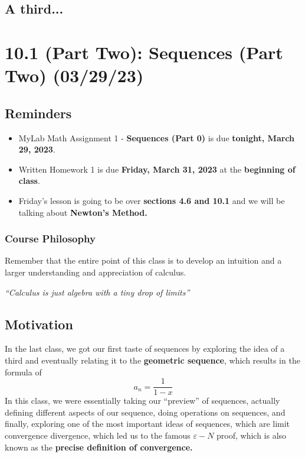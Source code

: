 \documentclass{report}
\begin{document}
\begin{sloppypar}
\section{A third...}

\chapter{10.1 (Part Two): Sequences (Part Two) (03/29/23)}
\section{Reminders}
\begin{itemize}
  \item MyLab Math Assignment 1 - \textbf{Sequences (Part 0)} is
        due \textbf{tonight, March 29, 2023}.
  \item Written Homework 1 is due \textbf{Friday, March 31,
        2023} at the \textbf{beginning of class}.
  \item Friday's lesson is going to be over \textbf{sections
        4.6 and 10.1} and we will be talking about \textbf{
        Newton's Method. }
\end{itemize}
\subsection{Course Philosophy}
Remember that the entire point of this class is to develop
an intuition and a larger understanding and appreciation of
calculus.
\begin{center}
  \textit{``Calculus is just algebra with a tiny drop of
    limits''}
\end{center}
\section{Motivation}
In the last class, we got our first taste of sequences
by exploring the idea of a third and eventually relating it
to the \textbf{geometric sequence}, which results in the formula
of
\[ a_{n} = \frac{1}{1-x}\]
In this class, we were essentially taking our ``preview'' of
sequences, actually defining different aspects of our sequence,
doing operations on sequences, and finally, exploring
one of the most important ideas of sequences, which are
limit convergence divergence, which led us to the famous
$ \varepsilon - N $ proof, which is also known as the \textbf{precise
definition of convergence.}

\end{sloppypar}
\end{document}
